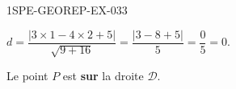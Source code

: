 \begin{corrige}{1SPE-GEOREP-EX-033}

$d = \dfrac{|3 \times 1 - 4 \times 2 + 5|}{\sqrt{9 + 16}} = \dfrac{|3 - 8 + 5|}{5} = \dfrac{0}{5} = 0$.

Le point $P$ est \textbf{sur} la droite $\mathcal{D}$.

\end{corrige}
